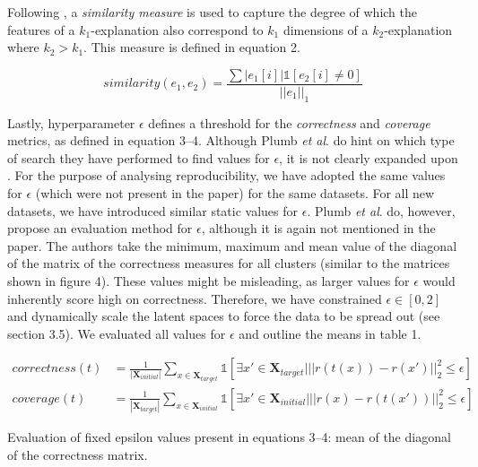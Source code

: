 Following \cite[p.~6]{plumb2020explaining}, a \textit{similarity measure} is used to capture the degree of which the features of a $k_1$-explanation also correspond to $k_1$ dimensions of a $k_2$-explanation where $k_2 > k_1$. This measure is defined in equation 2. 

\begin{equation}
similarity(e_1, e_2) = \frac{\sum|e_1[i]|\mathbb{1}[e_2[i] \neq 0]}{||e_1||_1}
\end{equation}

Lastly, hyperparameter $\epsilon$ defines a threshold for the \textit{correctness} and \textit{coverage} metrics, as defined in equation 3--4. Although Plumb \textit{et al}. do hint on which type of search they have performed to find values for $\epsilon$, it is not clearly expanded upon \cite[p.~4]{plumb2020explaining}. For the purpose of analysing reproducibility, we have adopted the same values for $\epsilon$ (which were not present in the paper) for the same datasets. For all new datasets, we have introduced similar static values for $\epsilon$. Plumb \textit{et al}. do, however, propose an evaluation method for $\epsilon$, although it is again not mentioned in the paper. The authors take the minimum, maximum and mean value of the diagonal of the matrix of the correctness measures for all clusters (similar to the matrices shown in figure 4). These values might be misleading, as larger values for $\epsilon$ would inherently score high on correctness. Therefore, we have constrained $\epsilon \in [0, 2]$ and dynamically scale the latent spaces to force the data to be spread out (see section 3.5). We evaluated all values for $\epsilon$ and outline the means in table 1.

\begin{align}
correctness(t) &= \frac{1}{|\boldsymbol{X}_{initial}|} \sum\limits_{x \in \boldsymbol{X}_{target}} \mathbb{1} [\exists x' \in \boldsymbol{X}_{target} | || r(t(x)) - r(x')||^2_2 \leq \epsilon]\\
coverage(t) &= \frac{1}{|\boldsymbol{X}_{target}|} \sum\limits_{x \in \boldsymbol{X}_{initial}} \mathbb{1} [\exists x' \in \boldsymbol{X}_{initial} | || r(x) - r(t(x'))||^2_2 \leq \epsilon]
\end{align}

\begin{table}[h]
  \centering
  
  \caption{Evaluation of fixed epsilon values present in equations 3--4: mean of the diagonal of the correctness matrix.}
\end{table}

